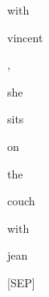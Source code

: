 \documentclass[varwidth=150mm]{standalone}
\begin{document}
\begin{CJK*}{UTF8}{gbsn}
{{{\colorbox{red!10.753179550170898}{\strut with} \colorbox{red!15.900394439697266}{\strut vincent} \colorbox{red!0.0}{\strut ,} \colorbox{red!4.817798614501953}{\strut she} \colorbox{red!0.0}{\strut sits} \colorbox{red!2.4212300777435303}{\strut on} \colorbox{red!2.21708083152771}{\strut the} \colorbox{red!2.1102099418640137}{\strut couch} \colorbox{red!2.3613109588623047}{\strut with} \colorbox{red!35.462440490722656}{\strut jean} \colorbox{red!19.152559280395508}{\strut [SEP]}
}}}
\end{CJK*}
\end{document}
